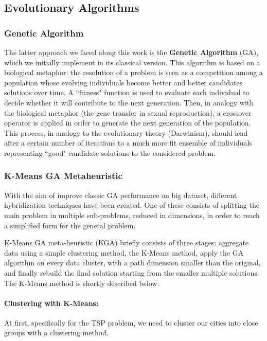 \documentclass[10pt]{article}
\begin{document}
\subsection{Evolutionary Algorithms}
\subsubsection{Genetic Algorithm} \label{sec:gen_alg}
The latter approach we faced along this work is the \textbf{Genetic Algorithm} (GA), which we initially implement in its classical version.
This algorithm is based on a biological metaphor: the resolution of a problem is seen as a competition among a population whose evolving individuals become better and better candidates solutions over time. 
A ``fitness" function is used to evaluate each individual to decide whether it will contribute to the next
generation. 
Then, in analogy with the biological metaphor (the gene transfer in sexual reproduction), a crossover operator is applied in order to generate the next generation of the population.
This process, in analogy to the evolutionary theory (Darwinism), should lead after a certain number of iterations to a much more fit ensemble of individuals representing ``good" candidate solutions to the considered problem.

\subsubsection{K-Means GA Metaheuristic} \label{sec:KGA}
With the aim of improve classic GA performance on big dataset, different hybridization techniques have been created.
One of these consists of splitting the main problem in multiple sub-problems, reduced in dimensions, in order to reach a simplified form for the general problem.

K-Means GA meta-heuristic (KGA) briefly consists of three stages: aggregate data using a simple clustering method, the K-Means method, apply the GA algorithm on every data cluster, with a path dimension smaller than the original, and finally rebuild the final solution starting from the smaller multiple solutions.
The K-Means method is shortly described below.

\paragraph{Clustering with K-Means:} 
At first, specifically for the TSP problem, we need to cluster our cities into close groups with a clustering method.
\end{document}
